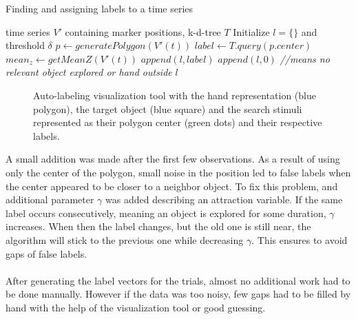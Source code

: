 \begin{algorithm}
	\caption{Finding and assigning labels to a time series}
	\label{label-gen}
	 \begin{algorithmic}[1]
	 	\Require time series $ V' $ containing marker positions,  k-d-tree $ T $
	 	\Begin 
	 	\State Initialize $l = \{\} $ and threshold $ \delta $ 
	 	\State $ p \leftarrow generatePolygon(V'(t)) $
	 	\State $ label \leftarrow T.query(p.center) $
	 	\State $ mean_z \leftarrow getMeanZ(V'(t)) $
	 	 \State $ append(l,label)$ \Else
	 	\State $ append(l,0)$ \textit{ //means no relevant object explored or hand outside} \EndIf
	 	\EndFor
	 	\State \Return $ l $
	 	\End
	 \end{algorithmic}
\end{algorithm}

\begin{figure}[h]
	\caption{Auto-labeling visualization tool with the hand representation (blue polygon), the target object (blue square) and the search stimuli represented as their polygon center (green dots) and their respective labels.}
	\label{auto_label}
\end{figure}

A small addition was made after the first few observations. As a result of using only the center of the polygon, small noise in the position led to false labels when the center appeared to be closer to a neighbor object. To fix this problem, and additional parameter $ \gamma $ was added describing an attraction variable. If the same label occurs consecutively, meaning an object is explored for some duration, $ \gamma $ increases. When then the label changes, but the old one is still near, the algorithm will stick to the previous one while decreasing $ \gamma $. This ensures to avoid gaps of false labels.\\
\\
After generating the label vectors for the trials, almost no additional work had to be done manually. However if the data was too noisy, few gaps had to be filled by hand with the help of the visualization tool or good guessing.

